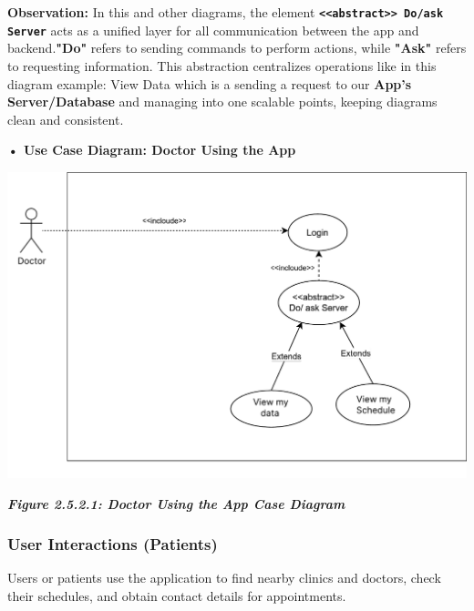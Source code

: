 \documentclass[12pt]{report}
\begin{document}
\vspace{0.5cm}

\noindent \textbf{Observation:} In this and other diagrams, the element \textbf{ \texttt{<<abstract>> Do/ask Server}} acts as a unified layer for all communication between the app and backend.\textbf{"Do"} refers to sending commands to perform actions, while \textbf{"Ask"} refers to requesting information. This abstraction centralizes operations like in this diagram example: View Data which is a sending a request to our \textbf{App's Server/Database} and managing into one scalable points, keeping diagrams clean and consistent.



\vspace{0.5cm}
\noindent \textbf{• Use Case Diagram: Doctor Using the App}
\vspace{0.6cm}
\begin{center}
	\includegraphics[width=\textwidth]{images/doctorCAS.pdf} 
\end{center}
\vspace{-0.85cm}
\begin{center}
	\textit{\textbf{Figure 2.5.2.1: Doctor Using the App Case Diagram}}
\end{center}

\newpage
\subsubsection{\textbf{User Interactions (Patients)}}
Users or patients use the application to find nearby clinics and doctors, check their schedules, and obtain contact details for appointments.
\end{document}
